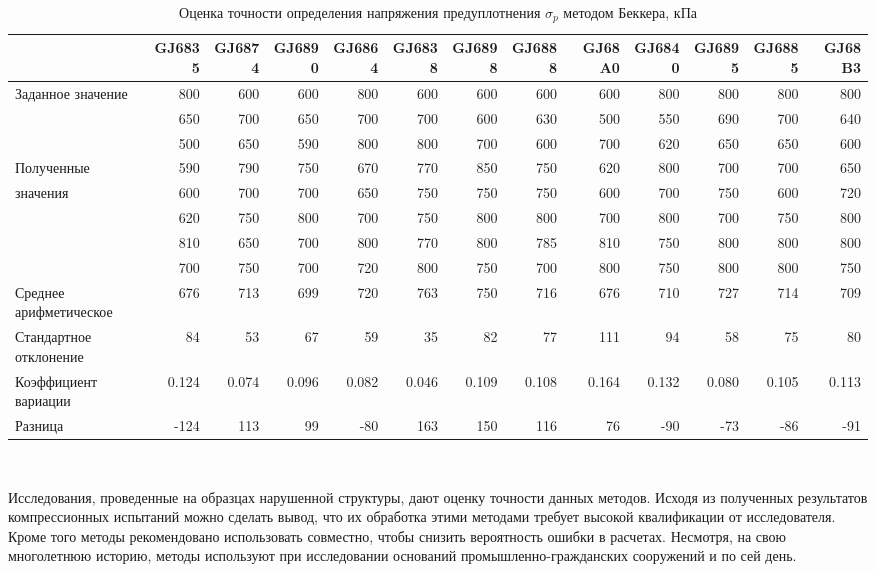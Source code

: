 \begin{sidewaystable}[p]
    \centering
    \small
    \caption{Оценка точности определения напряжения предуплотнения $\sigma_p$ методом Беккера, кПа} \label{tab:accuracy-beck}
    \begin{tabular}{@{}lrrrrrrrrrrrr@{}}
    \toprule
     & GJ6835 & GJ6874 & GJ6890 & GJ6864 & GJ6838 & GJ6898 & GJ6888 & GJ68A0 & GJ6840 & GJ6895 & GJ6885 & GJ68B3 \\
    \midrule
    Заданное значение & 800 & 600 & 600 & 800 & 600 & 600 & 600 & 600 & 800 & 800 & 800 & 800 \\
    \midrule
     & 650 & 700 & 650 & 700 & 700 & 600 & 630 & 500 & 550 & 690 & 700 & 640 \\
     & 500 & 650 & 590 & 800 & 800 & 700 & 600 & 700 & 620 & 650 & 650 & 600 \\
    Полученные & 590 & 790 & 750 & 670 & 770 & 850 & 750 & 620 & 800 & 700 & 700 & 650 \\
    значения & 600 & 700 & 700 & 650 & 750 & 750 & 750 & 600 & 700 & 750 & 600 & 720 \\
     & 620 & 750 & 800 & 700 & 750 & 800 & 800 & 700 & 800 & 700 & 750 & 800 \\
     & 810 & 650 & 700 & 800 & 770 & 800 & 785 & 810 & 750 & 800 & 800 & 800 \\
     & 700 & 750 & 700 & 720 & 800 & 750 & 700 & 800 & 750 & 800 & 800 & 750 \\
    \midrule
    Среднее арифметическое & 676 & 713 & 699 & 720 & 763 & 750 & 716 & 676 & 710 & 727 & 714 & 709 \\
    Стандартное отклонение & 84 & 53 & 67 & 59 & 35 & 82 & 77 & 111 & 94 & 58 & 75 & 80 \\
    Коэффициент вариации & 0.124 & 0.074 & 0.096 & 0.082 & 0.046 & 0.109 & 0.108 & 0.164 & 0.132 & 0.080 & 0.105 & 0.113 \\
    \midrule
    Разница & -124 & 113 & 99 & -80 & 163 & 150 & 116 & 76 & -90 & -73 & -86 & -91 \\
    \bottomrule
    \end{tabular}
    \\ 
\end{sidewaystable}


Исследования, проведенные на образцах нарушенной структуры, дают оценку точности данных методов. Исходя из полученных результатов компрессионных испытаний можно сделать вывод, что их обработка этими методами требует высокой квалификации от исследователя. Кроме того методы рекомендовано использовать совместно, чтобы снизить вероятность ошибки в расчетах. Несмотря, на свою многолетнюю историю, методы используют при исследовании оснований промышленно-гражданских сооружений и по сей день. 

